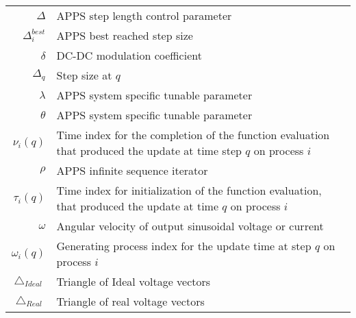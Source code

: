 \begin{scriptsize}
\begin{tabularx}{\textwidth}{r|X}
$\Delta$													& APPS step length control parameter\\
$\Delta_i^{best}$											& APPS best reached step size\\
$\delta$                    & DC-DC modulation coefficient\\
$\Delta_q$                        & Step size at $q$\\
$\lambda$                   & APPS system specific tunable parameter\\
$\theta$                    & APPS system specific tunable parameter\\
$\nu_i(q)$ 												& Time index for the completion of the function evaluation that produced the update at time step $q$ on process $i$\\
$\rho$																& APPS infinite sequence iterator\\
$\tau_i(q)$												& Time index for initialization of the function evaluation, that produced the update at time $q$ on process $i$\\
$\omega$													& Angular velocity of output sinusoidal voltage or current\\
$\omega_i(q)$ 										& Generating process index for the update time at step $q$ on process $i$\\
$\bigtriangleup_{Ideal}$          & Triangle of Ideal voltage vectors\\
  $\bigtriangleup_{Real}$           & Triangle of real voltage vectors\\
  
\end{tabularx}
\end{scriptsize} 